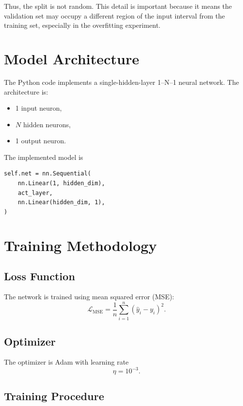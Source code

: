 \documentclass[11pt]{article}
\begin{document}
Thus, the split is not random. This detail is important because it means the validation set may occupy a different region of the input interval from the training set, especially in the overfitting experiment.

\section{Model Architecture}

The Python code implements a single-hidden-layer 1--N--1 neural network. The architecture is:

\begin{itemize}
    \item 1 input neuron,
    \item $N$ hidden neurons,
    \item 1 output neuron.
\end{itemize}

The implemented model is
\begin{lstlisting}
self.net = nn.Sequential(
    nn.Linear(1, hidden_dim),
    act_layer,
    nn.Linear(hidden_dim, 1),
)
\end{lstlisting}

\section{Training Methodology}

\subsection{Loss Function}

The network is trained using mean squared error (MSE):
\begin{equation}
\mathcal{L}_{\text{MSE}} = \frac{1}{n}\sum_{i=1}^{n}\left(\hat{y}_i - y_i\right)^2.
\end{equation}

\subsection{Optimizer}

The optimizer is Adam with learning rate
\begin{equation}
\eta = 10^{-3}.
\end{equation}

\subsection{Training Procedure}
\end{document}
